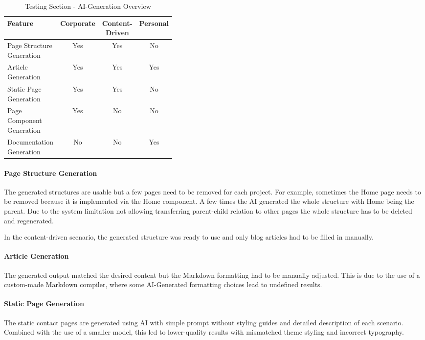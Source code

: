 \begin{table}[H]
    \centering
    \begin{tabular}{|p{0.4\linewidth}|c|c|c|}
        \hline
        \textbf{Feature}
        & \textbf{Corporate}
        & \textbf{Content-Driven}
        & \textbf{Personal}
        \\
        \hline
        Page Structure Generation
        & Yes
        & Yes
        & No
        \\
        \hline
        Article Generation
        & Yes
        & Yes
        & Yes
        \\
        \hline
        Static Page Generation
        & Yes
        & Yes
        & No
        \\
        \hline
        Page Component Generation
        & Yes
        & No
        & No
        \\
        \hline
        Documentation Generation
        & No
        & No
        & Yes
        \\
        \hline
    \end{tabular}
    \caption{Testing Section - AI-Generation Overview}
    \label{tab:evaluationTestAiOverview}
\end{table}

\paragraph{Page Structure Generation}
The generated structures are usable but a few pages need to be removed for each project.
For example, sometimes the Home page needs to be removed because it is implemented via the Home component.
A few times the AI generated the whole structure with Home being the parent.
Due to the system limitation not allowing transferring parent-child relation to other pages the whole structure
has to be deleted and regenerated.

In the content-driven scenario, the generated structure was ready to use and only blog articles had to be filled in manually.

\paragraph{Article Generation}
The generated output matched the desired content but the Markdown formatting had to be manually adjusted.
This is due to the use of a custom-made Markdown compiler, where some AI-Generated formatting choices
lead to undefined results.

\paragraph{Static Page Generation}
The static contact pages are generated using AI with simple prompt without styling guides
and detailed description of each scenario.
Combined with the use of a smaller model, this led to lower-quality results with mismatched theme styling
and incorrect typography.


